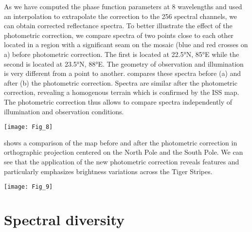 \documentclass{arxiv-icarus}
\begin{document}
As we have computed the phase function parameters at 8 wavelengths and used an interpolation to extrapolate the correction to the 256 spectral channels, we can obtain corrected reflectance spectra. To better illustrate the effect of the photometric correction, we compare spectra of two points close to each other located in a region with a significant seam on the mosaic (blue and red crosses on a) before photometric correction. The first is located at \ang{22.5}N, \ang{85}E while the second is located at \ang{23.5}N, \ang{88}E. The geometry of observation and illumination is very different from a point to another.  compares these spectra before (a) and after (b) the photometric correction. Spectra are similar after the photometric correction, revealing a homogenous terrain which is confirmed by the ISS map. The photometric correction thus allows to compare spectra independently of illumination and observation conditions.

\begin{figure*}[!ht]
    \vspace{.25cm}
    \texttt{[image: Fig\_8]}
    \caption{Spectrum comparison before (a) and after (b) the photometric correction. The red spectrum corresponds to the cube 1487299582\_1 located at \ang{22.5}N, \ang{85}E ($i = \ang{72}$, $e = \ang{49}$, $\alpha = \ang{26}$) while the blue spectrum corresponds to the cube 1489049741\_1 located at \ang{23.5}N, \ang{88}E ($i = \ang{50}$, $e = \ang{65}$, $\alpha = \ang{45}$).}
    \label{fig:fig_8}
\end{figure*}

 shows a comparison of the map before and after the photometric correction in orthographic projection centered on the North Pole and the South Pole. We can see that the application of the new photometric correction reveals features and particularly emphasizes brightness variations across the Tiger Stripes.

\begin{figure*}[!ht]
    \texttt{[image: Fig\_9]}
    \caption{Uncorrected mosaic at \SI{1.8}{\um} in orthographic projection centered on the North Pole (a) and the South Pole (c). \SI{1.8}{\um} map corrected with the photometric function described in \eqref{eq_9} centered on the North Pole (b) and the South Pole (d).}
    \label{fig:fig_9}
\end{figure*}


\section{Spectral diversity}\label{sec:sec_4}
\end{document}
